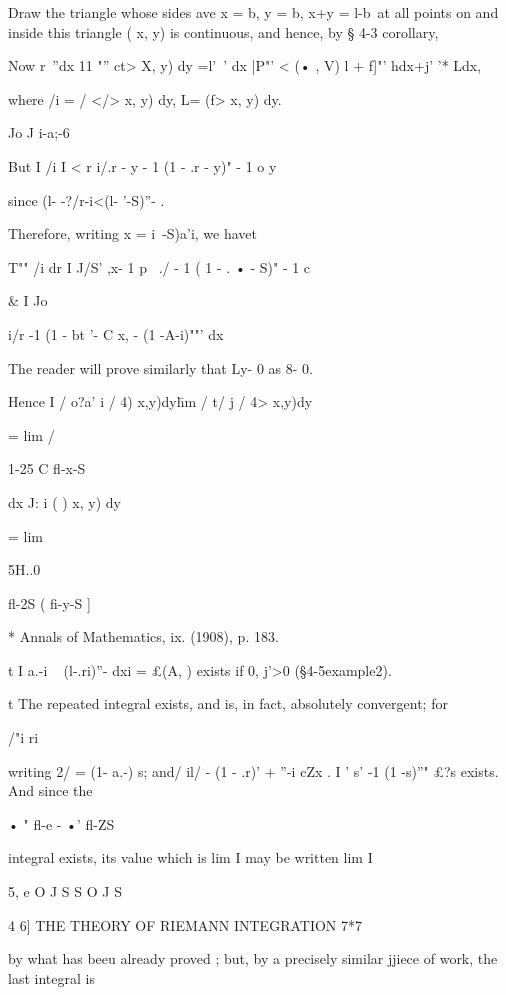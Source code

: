 Draw the triangle whose sides ave x = b, y = b, x+y = l-b\ at all points on and inside 
this triangle (   x, y) is continuous, and hence, by § 4-3 corollary, 

Now 
r~''dx 11 "'' ct>  X, y) dy  =l'~'  dx  |P"' <  (•  , V)  l  + f]"'  hdx+j'  '* Ldx, 

where /i = / </>  x, y) dy, L= (f>  x, y) dy. 

Jo J i-a;-6 

But I /i I < r i/.r  -   y - 1 (1 - .r - y)" - 1 o y 

since (l- -?/r-i<(l- '-S)''- . 

Therefore, writing x = i\ -S)a'i, we havet 

T""  /i dr I   J/S'  ,x- 1 p~  ./ - 1 ( 1 - . • - S)" - 1 c  

  \& I Jo 

 i/r  -1 (1 - bt '- C x, -  (1 -A-i)""' dx 

The reader will prove similarly that Ly- 0 as 8-  0. 

Hence I / o?a' i / 4) x,y)dy\= hm / t/  j / 4> x,y)dy\ 



= lim / 



1-25 C fl-x-S 

dx J: i ( ) x, y) dy 



= lim 

5H..0 



fl-2S ( fi-y-S ] 



* Annals of Mathematics, ix. (1908), p. 183. 

t I a.-i ~ (l-.ri)''-  dxi = £(A,  ) exists if  0, j'>0 (§4-5example2). 

t The repeated integral exists, and is, in fact, absolutely convergent; for 

/"i ri 

writing 2/ = (1- a.-) s; and/ il/ -  (1 - .r)'  + ''-i cZx . I ' s' -1 (1 -s)''"  £?s exists. And since the 

• " fl-e - •' fl-ZS 

integral exists, its value which is lim I may be written lim I 

5, e O J S S O J S 



4 6] THE THEORY OF RIEMANN INTEGRATION 7*7 

by what has beeu already proved ; but, by a precisely similar jjiece of work, the last 
integral is 

